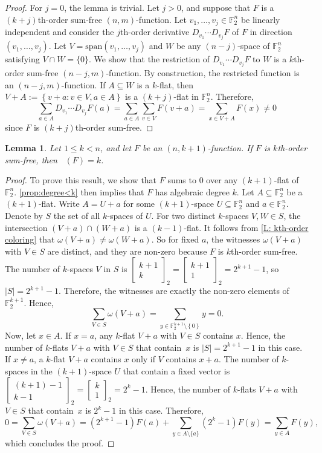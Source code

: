 \documentclass[12pt]{article}
\newtheorem{lem}[thm]{Lemma}
\theoremstyle{definition}
\newcommand{\Gauss}[2]{{\begin{bmatrix} #1 \\ #2 \end{bmatrix}_2}}
\newcommand{\F}{\mathbb F}
\newcommand{\Fpnv}{\mathbb{F}_2^n}
\newcommand{\set}[1]{\left\{#1\right\}}
\DeclareMathOperator{\degalg}{\deg_{{alg}}}
\newcounter{numb}
\begin{document}
\begin{proof}
    For $j=0$, the lemma is trivial. Let $j > 0$, and suppose that $F$ is a $(k+j)$th-order sum-free $(n, m)$-function. Let $v_1, \dots, v_j \in \F_{2}^n$ be linearly independent and consider the $j$th-order derivative $D_{v_1}\cdots D_{v_j}F$ of $F$ in direction $(v_1, \dots, v_j)$. Let $V = \text{span}(v_1, \dots, v_j)$ and $W$ be any $(n-j)$-space of $\Fpnv$ satisfying $V \cap W = \{ 0 \}$. We show that the restriction of $D_{v_1}\cdots D_{v_j}F$ to $W$ is a $k$th-order sum-free $(n-j, m)$-function. By construction, the restricted function is an $(n-j, m)$-function. If $A \subseteq W$ is a $k$-flat, then $V + A := \set{v+a : v \in V, a \in A}$ is a $(k +j)$-flat in $\Fpnv$. Therefore, 
    $$
    \sum_{a \in A}D_{v_1}\cdots D_{v_j}F(a) = \sum_{a \in A}\sum_{v \in V}F(v + a) = \sum_{x \in V+A} F(x) \neq 0
    $$ 
     since $F$ is $(k+j)$th-order sum-free.
\end{proof}


\begin{lem}\label{L: kth-order-kth-degree}
    Let $1\le k<n$, and let $F$ be an $(n,k+1)$-function. If $F$ is $k$th-order sum-free, then $\degalg(F) = k$.
\end{lem}
\begin{proof}
    To prove this result, we show that $F$ sums to 0 over any $(k+1)$-flat of $\Fpnv$. \cref{prop:degree<k} then implies that $F$ has algebraic degree $k$. Let $A\subseteq \Fpnv$ be a $(k+1)$-flat. Write $A = U+a$ for some $(k+1)$-space $U\subseteq\Fpnv$ and $a \in \F_{2}^n$. Denote by $S$ the set of all $k$-spaces of $U$. For two distinct $k$-spaces $V, W \in S$, the intersection $(V+a) \cap (W+a)$ is a $(k-1)$-flat. It follows from \cref{L: kth-order coloring} that $\omega(V+a) \neq \omega(W+a)$. So for fixed $a$, the witnesses $\omega(V+a)$ with $V \in S$ are distinct, and they are non-zero because $F$ is $k$th-order sum-free. The number of $k$-spaces $V$ in $S$ is $\Gauss{k+1}{k}=\Gauss{k+1}{1}=2^{k+1}-1$, so $|S|=2^{k+1}-1$. Therefore, the witnesses are exactly the non-zero elements of $\F_2^{k+1}$. Hence,
    \[
    \sum_{V \in S}\omega(V+a) = \sum_{y \in \F_{2}^{k+1}\setminus\set{0}}y = 0.
    \]
  Now, let $x\in A$. If $x=a$, any $k$-flat $V+a$ with $V\in S$ contains $x$. Hence, the number of $k$-flats $V+a$ with $V\in S$ that contain~$x$ is $|S|=2^{k+1}-1$ in this case. If $x\neq a$, a $k$-flat $V+a$ contains $x$ only if $V$ contains $x+a$. The number of $k$-spaces in the $(k+1)$-space $U$ that contain a fixed vector is $\Gauss{(k+1)-1}{k-1}=\Gauss{k}{1}=2^k-1$. Hence, the number of $k$-flats $V+a$ with $V\in S$ that contain~$x$ is $2^k - 1$ in this case.
    Therefore,
    \[
    0 = \sum_{V \in S} \omega(V + a) = (2^{k+1} - 1)F(a) + \sum_{y \in A\setminus \{ a \}} (2^k - 1)F(y) = \sum_{y \in A} F(y), 
    \]
    which concludes the proof.
\end{proof}
\end{document}
